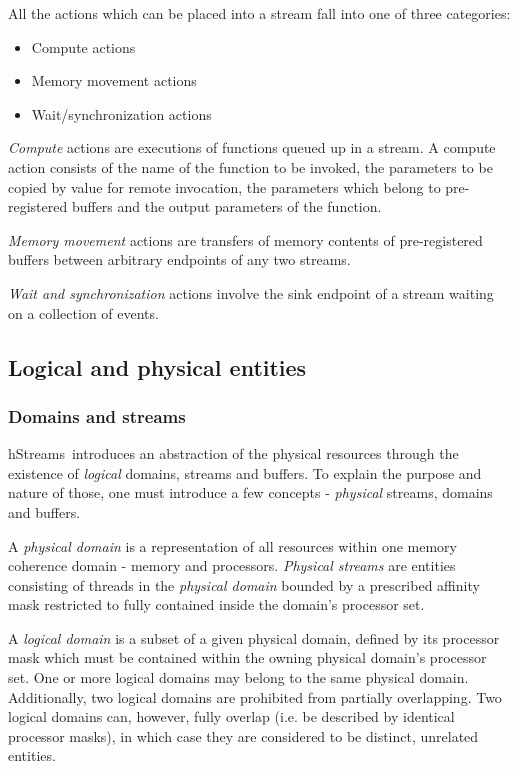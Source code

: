 \documentclass[a4,oneside]{book}
\newcommand{\hstreams}{hStreams}
\begin{document}
All the actions which can be placed into a stream fall into one of three categories:
\begin{itemize}
    \item Compute actions
    \item Memory movement actions
    \item Wait/synchronization actions
\end{itemize}

\emph{Compute} actions are executions of functions queued up in a stream.
A compute action consists of the name of the function to be invoked, the parameters to be copied by value for remote invocation, the parameters which belong to pre-registered buffers and the output parameters of the function.

\emph{Memory movement} actions are transfers of memory contents of pre-registered buffers between arbitrary endpoints of any two streams.

\emph{Wait and synchronization} actions involve the sink endpoint of a stream waiting on a collection of events.

\subsection{Logical and physical entities}
\subsubsection{Domains and streams}
\hstreams\ introduces an abstraction of the physical resources through the existence of \emph{logical} domains, streams and buffers.
To explain the purpose and nature of those, one must introduce a few concepts - \emph{physical} streams, domains and buffers.

A \emph{physical domain} is a representation of all resources within one memory coherence domain - memory and processors.
\emph{Physical streams} are entities consisting of threads in the \emph{physical domain} bounded by a prescribed affinity mask restricted to fully contained inside the domain's processor set.

A \emph{logical domain} is a subset of a given physical domain, defined by its processor mask which must be contained within the owning physical domain's processor set.
One or more logical domains may belong to the same physical domain.
Additionally, two logical domains are prohibited from partially overlapping.
Two logical domains can, however, fully overlap (i.e. be described by identical processor masks), in which case they are considered to be distinct, unrelated entities.
\end{document}
